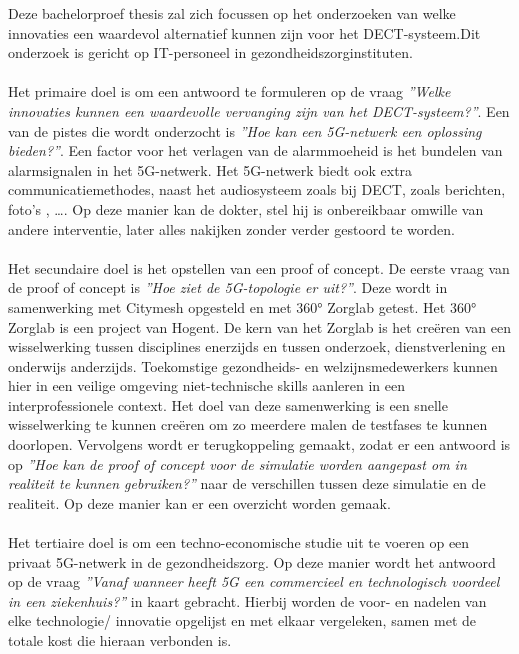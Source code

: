 Deze bachelorproef thesis zal zich focussen op het onderzoeken van welke innovaties een waardevol alternatief kunnen zijn voor het DECT-systeem.Dit onderzoek is gericht op IT-personeel in gezondheidszorginstituten.\\\\
Het primaire doel is om een antwoord te formuleren op de vraag \textit{''Welke innovaties kunnen een waardevolle vervanging zijn van het DECT-systeem?''}. Een van de pistes die wordt onderzocht is \textit{''Hoe kan een 5G-netwerk een oplossing bieden?''}. Een factor voor het verlagen van de alarmmoeheid is het bundelen van alarmsignalen in het 5G-netwerk. Het 5G-netwerk biedt ook extra communicatiemethodes, naast het audiosysteem zoals bij DECT, zoals berichten, foto's , \dots . Op deze manier kan de dokter, stel hij is onbereikbaar omwille van andere interventie, later alles nakijken zonder verder gestoord te worden. \\\\
Het secundaire doel is het opstellen van een proof of concept. De eerste vraag van de proof of concept is \textit{''Hoe ziet de 5G-topologie er uit?''}. Deze wordt in samenwerking met Citymesh opgesteld en met 360° Zorglab getest. Het 360° Zorglab is een project van Hogent. De kern van het Zorglab is het creëren van een wisselwerking tussen disciplines enerzijds en tussen onderzoek, dienstverlening en onderwijs anderzijds. Toekomstige gezondheids- en welzijnsmedewerkers kunnen hier in een veilige omgeving niet-technische skills aanleren in een interprofessionele context. \autocite{HOGENT2024} Het doel van deze samenwerking is een snelle wisselwerking te kunnen creëren om zo meerdere malen de testfases te kunnen doorlopen. Vervolgens wordt er terugkoppeling gemaakt, zodat er een antwoord is op \textit{''Hoe kan de proof of concept voor de simulatie worden aangepast om in realiteit te kunnen gebruiken?''} naar de verschillen tussen deze simulatie en de realiteit. Op deze manier kan er een overzicht worden gemaak.\\\\
Het tertiaire doel is om een techno-economische studie uit te voeren op een privaat 5G-netwerk in de gezondheidszorg. Op deze manier wordt het antwoord op de vraag \textit{''Vanaf wanneer heeft 5G een commercieel en technologisch voordeel in een ziekenhuis?''} in kaart gebracht. Hierbij worden de voor- en nadelen van elke technologie/ innovatie opgelijst en met elkaar vergeleken, samen met de totale kost die hieraan verbonden is.

